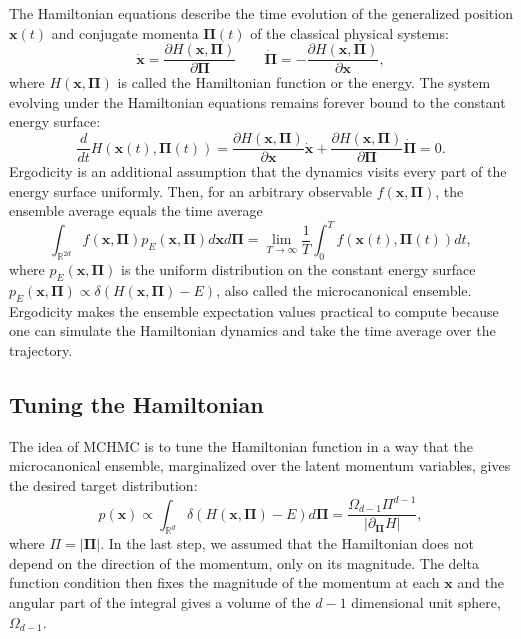 \documentclass[twoside,11pt]{article}
\newcommand{\p}{\boldsymbol{\Pi}}
\newcommand{\x}{\boldsymbol{x}}
\begin{document}
The Hamiltonian equations describe the time evolution of the generalized position $\x(t)$ and conjugate momenta $\p(t)$ of the classical physical systems:
\begin{equation} \label{eq: hamilton eqs}
    \dot{\x} = \frac{\partial H(\x, \p)}{\partial \p} \qquad \dot{\p} = -\frac{\partial H(\x, \p)}{\partial \x},
\end{equation}
where $H(\x, \p)$ is called the Hamiltonian function or the energy. The system evolving under the Hamiltonian equations remains forever bound to the constant energy surface:
\begin{equation}
    \frac{d}{dt} H(\x(t), \p(t)) = \frac{\partial H(\x, \p)}{\partial \x} \dot{\x} + \frac{\partial H(\x, \p)}{\partial \p} \dot{\p} = 0.
\end{equation}
Ergodicity is an additional assumption that the dynamics visits every part of the energy surface uniformly. Then, for an arbitrary observable $f(\x, \p)$, the ensemble average equals the time average
\begin{equation} \label{eq: time ensemble average}
    \int_{\mathbb{R}^{2 d}} f(\x, \p) p_{E}(\x, \p) d \x d\p = \lim_{T \xrightarrow[]{} \infty} \frac{1}{T} \int_0^T f(\x(t), \p(t)) dt,
\end{equation}
where $p_E(\x, \p)$ is the uniform distribution on the constant energy surface $p_E(\x, \p) \propto \delta(H(\x, \p) - E)$, also called the microcanonical ensemble.
Ergodicity makes the ensemble expectation values practical to compute because one can simulate the Hamiltonian dynamics and take the time average over the trajectory.

\subsection{Tuning the Hamiltonian}
The idea of MCHMC is to tune the Hamiltonian function in a way that the microcanonical ensemble, marginalized over the latent momentum variables, gives the desired target distribution:
\begin{equation}\label{eq: marginal condition}
    p(\x) \propto \int_{\mathbb{R}^d} \delta(H(\x, \p) - E) d \p = \frac{\Omega_{d-1} \Pi^{d-1}}{\vert \partial_{\p} H\vert},
\end{equation}
where $\Pi = \vert \p \vert$. In the last step, we assumed that the Hamiltonian does not depend on the direction of the momentum, only on its magnitude. The delta function condition then fixes the magnitude of the momentum at each $\x$ and the angular part of the integral gives a volume of the $d-1$ dimensional unit sphere, $\Omega_{d-1}$.
\end{document}
